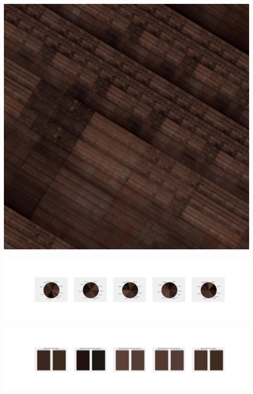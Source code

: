 \documentclass[11pt]{article}
\begin{document}
\begin{landscape}
    \begin{center}
    \includegraphics[width=\textwidth]{./nbimg/file (254).jpg}
    \end{center}

    \begin{center}
    \includegraphics[width=250mm]{./nbimg/pie-172.jpg}
    \end{center}

    \begin{center}
    \includegraphics[width=250mm]{./nbimg/peak-172.jpg}
    \end{center}
    


\end{landscape}
\end{document}
